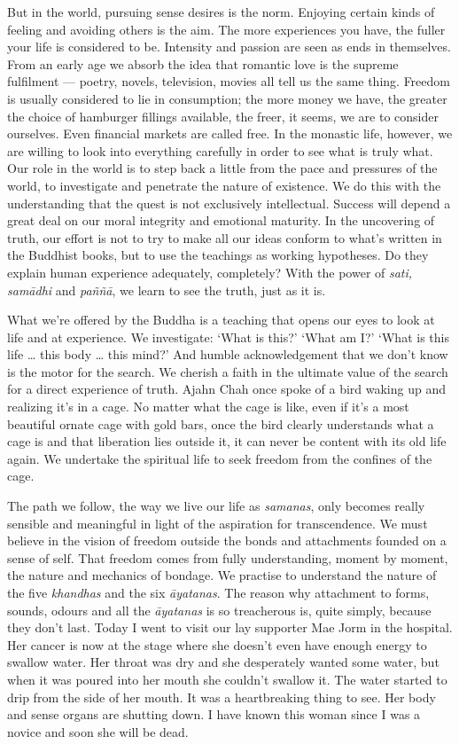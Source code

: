 But in the world, pursuing sense desires is the norm. Enjoying certain
kinds of feeling and avoiding others is the aim. The more experiences
you have, the fuller your life is considered to be. Intensity and
passion are seen as ends in themselves. From an early age we absorb the
idea that romantic love is the supreme fulfilment --- poetry, novels,
television, movies all tell us the same thing. Freedom is usually
considered to lie in consumption; the more money we have, the greater
the choice of hamburger fillings available, the freer, it seems, we are
to consider ourselves. Even financial markets are called free. In the
monastic life, however, we are willing to look into everything carefully
in order to see what is truly what. Our role in the world is to step
back a little from the pace and pressures of the world, to investigate
and penetrate the nature of existence. We do this with the understanding
that the quest is not exclusively intellectual. Success will depend a
great deal on our moral integrity and emotional maturity. In the
uncovering of truth, our effort is not to try to make all our ideas
conform to what's written in the Buddhist books, but to use the
teachings as working hypotheses. Do they explain human experience
adequately, completely? With the power of \emph{sati, samādhi} and
\emph{paññā}, we learn to see the truth, just as it is.

What we're offered by the Buddha is a teaching that opens our eyes to
look at life and at experience. We investigate: `What is this?' `What am
I?' `What is this life \ldots{} this body \ldots{} this mind?' And
humble acknowledgement that we don't know is the motor for the search.
We cherish a faith in the ultimate value of the search for a direct
experience of truth. Ajahn Chah once spoke of a bird waking up and
realizing it's in a cage. No matter what the cage is like, even if it's
a most beautiful ornate cage with gold bars, once the bird clearly
understands what a cage is and that liberation lies outside it, it can
never be content with its old life again. We undertake the spiritual
life to seek freedom from the confines of the cage.

The path we follow, the way we live our life as \emph{samanas}, only
becomes really sensible and meaningful in light of the aspiration for
transcendence. We must believe in the vision of freedom outside the
bonds and attachments founded on a sense of self. That freedom comes
from fully understanding, moment by moment, the nature and mechanics of
bondage. We practise to understand the nature of the five
\emph{khandhas} and the six \emph{āyatanas}. The reason why attachment
to forms, sounds, odours and all the \emph{āyatanas} is so treacherous
is, quite simply, because they don't last. Today I went to visit our lay
supporter Mae Jorm in the hospital. Her cancer is now at the stage where
she doesn't even have enough energy to swallow water. Her throat was dry
and she desperately wanted some water, but when it was poured into her
mouth she couldn't swallow it. The water started to drip from the side
of her mouth. It was a heartbreaking thing to see. Her body and sense
organs are shutting down. I have known this woman since I was a novice
and soon she will be dead.

